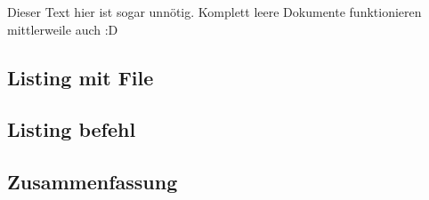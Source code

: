 \documentclass[Typ=Mitschrieb,Jake]{Lilly}
\begin{document}
Dieser Text hier ist sogar unnötig. Komplett leere Dokumente funktionieren mittlerweile auch :D

\subsection{Listing mit File}


\subsection{Listing befehl}




\clearpage

\subsection{Zusammenfassung}







\end{document}
